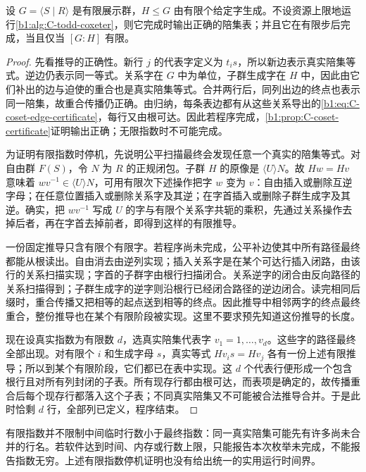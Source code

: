 \begin{proposition}\label{b1:prop:C-todd-coxeter-termination}
	设 \(G=\langle S\mid R\rangle\) 是有限展示群，\(H\leq G\) 由有限个给定字生成。不设资源上限地运行\cref{b1:alg:C-todd-coxeter}，则它完成时输出正确的陪集表；并且它在有限步后完成，当且仅当 \([G:H]\) 有限。
\end{proposition}

\begin{proof}
	先看推导的正确性。新行 \(j\) 的代表字定义为 \(t_i s\)，所以新边表示真实陪集等式。逆边仍表示同一等式。关系字在 \(G\) 中为单位，子群生成字在 \(H\) 中，因此由它们补出的边与迫使的重合也是真实陪集等式。合并两行后，同列出边的终点也表示同一陪集，故重合传播仍正确。由归纳，每条表边都有从这些关系导出的\eqref{b1:eq:C-coset-edge-certificate}，每行又由根可达。因此若程序完成，\cref{b1:prop:C-coset-certificate}证明输出正确；无限指数时不可能完成。

	为证明有限指数时停机，先说明公平扫描最终会发现任意一个真实的陪集等式。对自由群 \(F(S)\)，令 \(N\) 为 \(R\) 的正规闭包。子群 \(H\) 的原像是 \(\langle U\rangle N\)。故 \(Hw=Hv\) 意味着 \(wv^{-1}\in\langle U\rangle N\)，可用有限次下述操作把字 \(w\) 变为 \(v\)：自由插入或删除互逆字母；在任意位置插入或删除关系字及其逆；在字首插入或删除子群生成字及其逆。确实，把 \(wv^{-1}\) 写成 \(U\) 的字与有限个关系字共轭的乘积，先通过关系操作去掉后者，再在字首去掉前者，即得到这样的有限推导。

	一份固定推导只含有限个有限字。若程序尚未完成，公平补边使其中所有路径最终都能从根读出。自由消去由逆列实现；插入关系字是在某个可达行插入闭路，由该行的关系扫描实现；字首的子群字由根行扫描闭合。关系逆字的闭合由反向路径的关系扫描得到；子群生成字的逆字则沿根行已经闭合路径的逆边闭合。读完相同后缀时，重合传播又把相等的起点送到相等的终点。因此推导中相邻两字的终点最终重合，整份推导也在某个有限阶段被实现。这里不要求预先知道这份推导的长度。

	现在设真实指数为有限数 \(d\)，选真实陪集代表字 \(v_1=1,\ldots,v_d\)。这些字的路径最终全部出现。对有限个 \(i\) 和生成字母 \(s\)，真实等式 \(Hv_i s=Hv_j\) 各有一份上述有限推导；所以到某个有限阶段，它们都已在表中实现。这 \(d\) 个代表行便形成一个包含根行且对所有列封闭的子表。所有现存行都由根可达，而表项是确定的，故传播重合后每个现存行都落入这个子表；不同真实陪集又不可能被合法推导合并。于是此时恰剩 \(d\) 行，全部列已定义，程序结束。
\end{proof}

有限指数并不限制中间临时行数小于最终指数：同一真实陪集可能先有许多尚未合并的行名。若软件达到时间、内存或行数上限，只能报告本次枚举未完成，不能报告指数无穷。上述有限指数停机证明也没有给出统一的实用运行时间界。


